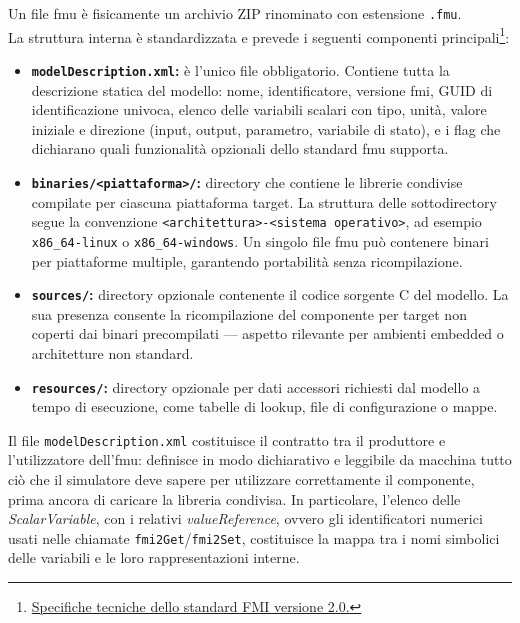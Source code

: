 Un file \ac{fmu} è fisicamente un archivio ZIP rinominato con estensione \texttt{.fmu}.\\La struttura interna è standardizzata e prevede i seguenti componenti principali\footnote{\href{https://fmi-standard.org/assets/releases/FMI_for_ModelExchange_and_CoSimulation_v2.0.pdf}{Specifiche tecniche dello standard FMI versione 2.0.}}:

\begin{itemize}
    \item \textbf{\texttt{modelDescription.xml}:} è l'unico file obbligatorio. Contiene tutta la descrizione statica del modello: nome, identificatore, versione \ac{fmi}, GUID di identificazione univoca, elenco delle variabili scalari con tipo, unità, valore iniziale e direzione (input, output, parametro, variabile di stato), e i flag che dichiarano quali funzionalità opzionali dello standard     \ac{fmu} supporta.

    \item \textbf{\texttt{binaries/<piattaforma>/}:} directory che contiene le librerie condivise compilate per ciascuna piattaforma target. La struttura delle sottodirectory segue la convenzione \texttt{<architettura>-<sistema operativo>}, ad esempio \texttt{x86\_64-linux} o \texttt{x86\_64-windows}. Un singolo file \ac{fmu} può contenere binari per piattaforme multiple, garantendo portabilità senza ricompilazione.

    \item \textbf{\texttt{sources/}:} directory opzionale contenente il codice sorgente C del modello. La sua presenza consente la ricompilazione del componente per target non coperti dai binari precompilati — aspetto rilevante per ambienti embedded o architetture non standard.

    \item \textbf{\texttt{resources/}:} directory opzionale per dati accessori richiesti dal modello a tempo di esecuzione, come tabelle di lookup, file di configurazione o mappe.
\end{itemize}

Il file \texttt{modelDescription.xml} costituisce il contratto tra il produttore e l'utilizzatore dell'\ac{fmu}: definisce in modo dichiarativo e leggibile da macchina tutto ciò che il simulatore deve sapere per utilizzare correttamente il componente, prima ancora di caricare la libreria condivisa. In particolare, l'elenco delle \textit{ScalarVariable}, con i relativi \textit{valueReference}, ovvero gli identificatori numerici usati nelle chiamate \texttt{fmi2Get}/\texttt{fmi2Set}, costituisce la mappa tra i nomi simbolici delle variabili e le loro rappresentazioni interne.

